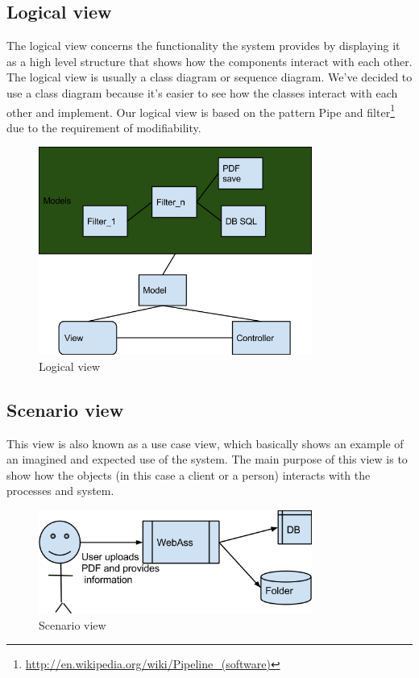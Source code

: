 \subsection{Logical view}
The logical view concerns the functionality the system provides by displaying it as a high level structure that shows how the components interact with each other. The logical view is usually a class diagram or sequence diagram. We've decided to use a class diagram because it's easier to see how the classes interact with each other and implement. Our logical view is based on the pattern Pipe and filter\footnote{\href{http://en.wikipedia.org/wiki/Pipeline_(software)}{http://en.wikipedia.org/wiki/Pipeline\_(software)}} due to the requirement of modifiability.
\begin{figure}[H]
\centering
\includegraphics[width=0.8\textwidth]{images/architecture00.png}
\caption{Logical view}
\label{fig:logical_view}
\end{figure}


\subsection{Scenario view}
This view is also known as a use case view, which basically shows an example of an imagined and expected use of the system. The main purpose of this view is to show how the objects (in this case a client or a person) interacts with the processes and system.
\begin{figure}[H]
\centering
\includegraphics[width=0.8\textwidth]{images/architecture01.png}
\caption{Scenario view}
\label{fig:scenario_view}
\end{figure}




